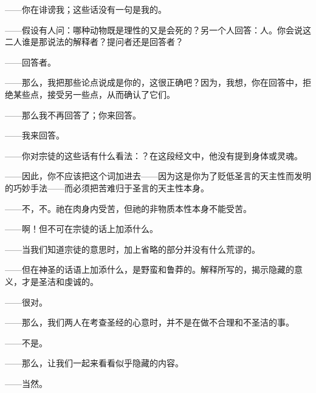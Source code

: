 ——你在诽谤我；这些话没有一句是我的。\par

——假设有人问：哪种动物既是理性的又是会死的？另一个人回答：人。你会说这二人谁是那说法的解释者？提问者还是回答者？\par

——回答者。\par

——那么，我把那些论点说成是你的，这很正确吧？因为，我想，你在回答中，拒绝某些点，接受另一些点，从而确认了它们。\par

——那么我不再回答了；你来回答。\par

——我来回答。\par

——你对宗徒的这些话有什么看法：？在这段经文中，他没有提到身体或灵魂。\par

——因此，你不应该把这个词加进去——因为这是你为了贬低圣言的天主性而发明的巧妙手法——而必须把苦难归于圣言的天主性本身。\par

——不，不。祂在肉身内受苦，但祂的非物质本性本身不能受苦。\par

——啊！但不可在宗徒的话上加添什么。\par

——当我们知道宗徒的意思时，加上省略的部分并没有什么荒谬的。\par

——但在神圣的话语上加添什么，是野蛮和鲁莽的。解释所写的，揭示隐藏的意义，才是圣洁和虔诚的。\par

——很对。\par

——那么，我们两人在考查圣经的心意时，并不是在做不合理和不圣洁的事。\par

——不是。\par

——那么，让我们一起来看看似乎隐藏的内容。\par

——当然。\par

